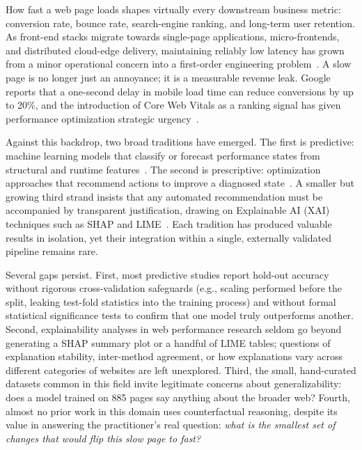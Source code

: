 \documentclass[sn-nature]{sn-jnl}
\begin{document}
How fast a web page loads shapes virtually every downstream business metric: conversion rate, bounce rate, search-engine ranking, and long-term user retention. As front-end stacks migrate towards single-page applications, micro-frontends, and distributed cloud-edge delivery, maintaining reliably low latency has grown from a minor operational concern into a first-order engineering problem~\cite{kaushik2024, xin2023}. A slow page is no longer just an annoyance; it is a measurable revenue leak. Google reports that a one-second delay in mobile load time can reduce conversions by up to 20\%, and the introduction of Core Web Vitals as a ranking signal has given performance optimization strategic urgency~\cite{mathur2024, vanriet2023}.

Against this backdrop, two broad traditions have emerged. The first is predictive: machine learning models that classify or forecast performance states from structural and runtime features~\cite{ghattas2025, mathur2024, sehwag2024, huang2023}. The second is prescriptive: optimization approaches that recommend actions to improve a diagnosed state~\cite{notz2024, surianarayanan2023, goscien2025, asha2025}. A smaller but growing third strand insists that any automated recommendation must be accompanied by transparent justification, drawing on Explainable AI (XAI) techniques such as SHAP and LIME~\cite{salih2024, hassija2024, ortigossa2024}. Each tradition has produced valuable results in isolation, yet their integration within a single, externally validated pipeline remains rare.

Several gaps persist. First, most predictive studies report hold-out accuracy without rigorous cross-validation safeguards (e.g., scaling performed before the split, leaking test-fold statistics into the training process) and without formal statistical significance tests to confirm that one model truly outperforms another. Second, explainability analyses in web performance research seldom go beyond generating a SHAP summary plot or a handful of LIME tables; questions of explanation stability, inter-method agreement, or how explanations vary across different categories of websites are left unexplored. Third, the small, hand-curated datasets common in this field invite legitimate concerns about generalizability: does a model trained on 885 pages say anything about the broader web? Fourth, almost no prior work in this domain uses counterfactual reasoning, despite its value in answering the practitioner's real question: \textit{what is the smallest set of changes that would flip this slow page to fast?}
\end{document}
